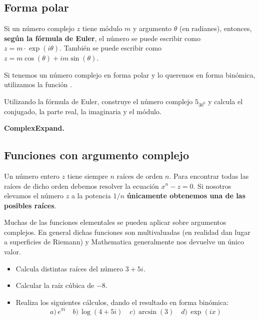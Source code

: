 \documentclass[a4paper,10pt, draft]{article}
\newcommand{\com}[1]{\textbf{\color{blue}{#1}}}
\newenvironment{ejer}{\begin{tcolorbox}[center title, title=Ejercicios,
fonttitle=\sffamily\bfseries,colback=blue!5,colframe=orange]}{\end{tcolorbox}}
\newenvironment{funciones}{\begin{tcolorbox}[center title, title=Nuevas funciones, fonttitle=\sffamily\bfseries, colback=green!5!white,colframe=red!75!black]}{\end{tcolorbox}\bigskip}
\begin{document}
  
  \newpage
  
  
  \subsection{Forma polar}
  
  Si un número complejo $z$ tiene módulo $m$ y argumento $\theta$ (en radianes), entonces, \textbf{según la fórmula de Euler}, el número se puede escribir como $z = m\cdot \exp(i\theta)$. También se puede escribir como $z= m\cos(\theta) + i m\sin(\theta)$.
  
  Si tenemos un número complejo en forma polar y lo queremos en forma binómica, utilizamos la función \com{ComplexExpand}.
  
\begin{ejer}



Utilizando la fórmula de Euler, construye el número complejo $5_{30^0}$ y calcula el conjugado, la parte real, la imaginaria y el módulo.

\end{ejer}  

\begin{funciones}

\textbf{ComplexExpand.}

\end{funciones}


\newpage  

\subsection{Funciones con argumento complejo}

Un número entero $z$ tiene siempre $n$ raíces de orden $n$. Para encontrar todas las raíces de dicho orden debemos resolver la ecuación $x^n-z=0$. Si nosotros elevamos el número $z$ a la potencia $1/n$ \textbf{únicamente obtenemos una de las posibles raíces}.



Muchas de las funciones elementales se pueden aplicar sobre argumentos complejos. En general dichas funciones son multivaluadas (en realidad dan lugar a superficies de Riemann) y Mathematica generalmente nos devuelve un único valor.


\begin{ejer}

\begin{itemize}

\item Calcula distintas raíces del número $3+5i$.

\item Calcular la raíz cúbica de $-8$.

\item Realiza los siguientes cálculos, dando el resultado en forma binómica:
$$
a)\,e^{\pi i} \quad b)\,\log(4+5i)\quad c)\, \arcsin(3)\quad d)\,\exp(ix)
$$

\end{itemize}

\end{ejer} 
\end{document}
